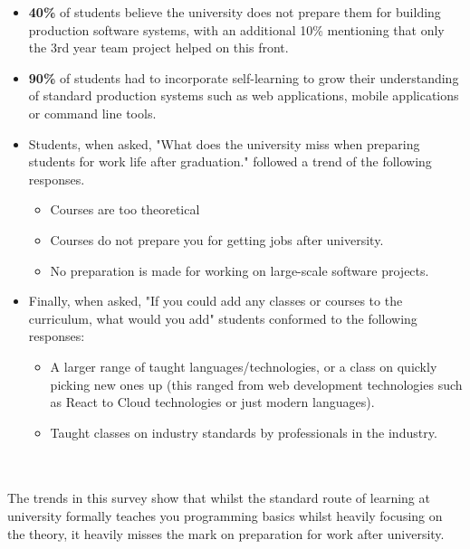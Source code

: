 \documentclass{l4proj}
\begin{document}
\begin{itemize}
    \item \textbf{40\%} of students believe the university does not prepare them for building production software systems, with an additional 10\% mentioning that only the 3rd year team project helped on this front.
    \item \textbf{90\%} of students had to incorporate self-learning to grow their understanding of standard production systems such as web applications, mobile applications or command line tools.
    \item Students, when asked, "What does the university miss when preparing students for work life after graduation." followed a trend of the following responses.
    \begin{itemize}
        \item Courses are too theoretical
        \item Courses do not prepare you for getting jobs after university.
        \item No preparation is made for working on large-scale software projects.
    \end{itemize}
    \item Finally, when asked, "If you could add any classes or courses to the curriculum, what would you add" students conformed to the following responses:
    \begin{itemize}
        \item A larger range of taught languages/technologies, or a class on quickly picking new ones up (this ranged from web development technologies such as React to Cloud technologies or just modern languages).
        \item Taught classes on industry standards by professionals in the industry.
    \end{itemize}
\end{itemize}
\text
\\ \\
The trends in this survey show that whilst the standard route of learning at university formally teaches you programming basics whilst heavily focusing on the theory, it heavily misses the mark on preparation for work after university.
\end{document}
